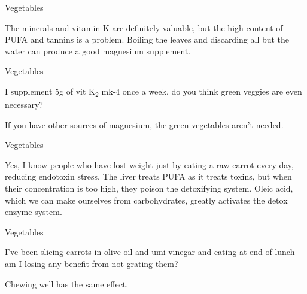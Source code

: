 \documentclass[11pt,oneside,openany,extrafontsizes]{memoir}
\begin{document}
\begin{standalonequote}{Vegetables}

    \begin{answer}
        The minerals and vitamin K are definitely valuable, but the high content of PUFA and tannins is a problem. Boiling the leaves and discarding all but the water can produce a good magnesium supplement.
    \end{answer}
\end{standalonequote}

\begin{qaexchange}{Vegetables}

    \begin{question}
        I supplement 5g of vit K\textsubscript{2} mk-4 once a week, do you think green veggies are even necessary?
    \end{question}

    \begin{answer}
        If you have other sources of magnesium, the green vegetables aren't needed.
    \end{answer}
\end{qaexchange}

\begin{standalonequote}{Vegetables}

    \begin{answer}
        Yes, I know people who have lost weight just by eating a raw carrot every day, reducing endotoxin stress. The liver treats PUFA as it treats toxins, but when their concentration is too high, they poison the detoxifying system. Oleic acid, which we can make ourselves from carbohydrates, greatly activates the detox enzyme system.
    \end{answer}
\end{standalonequote}

\begin{qaexchange}{Vegetables}

    \begin{question}
        I've been slicing carrots in olive oil and umi vinegar and eating at end of lunch am I losing any benefit from not grating them?
    \end{question}

    \begin{answer}
        Chewing well has the same effect.
    \end{answer}
\end{qaexchange}
\end{document}
